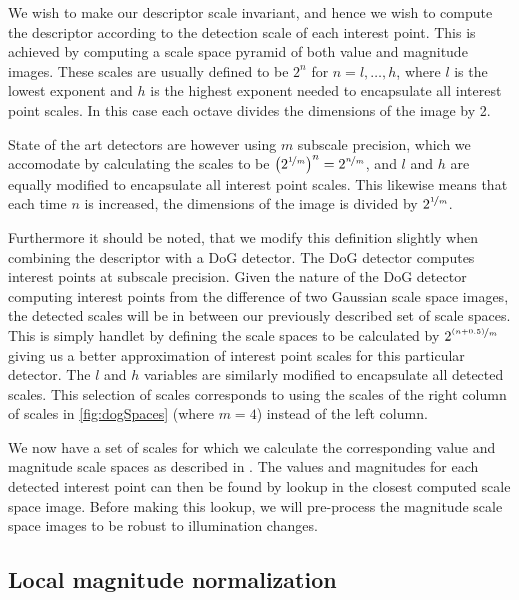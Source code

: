 \documentclass[thesis.tex]{subfiles}
\begin{document}
We wish to make our descriptor scale invariant, and hence we wish to compute the descriptor according to the detection scale of each interest point. This is achieved by computing a scale space pyramid of both value and magnitude images. These scales are usually defined to be $2^n$ for $n = l,\hdots,h$, where $l$ is the lowest exponent and $h$ is the highest exponent needed to encapsulate all interest point scales. In this case each octave divides the dimensions of the image by 2.

State of the art detectors are however using $m$ subscale precision, which we accomodate by calculating the scales to be $\left(2^{\nicefrac{1}{m}}\right)^n = 2^{\nicefrac{n}{m}}$, and $l$ and $h$ are equally modified to encapsulate all interest point scales. This likewise means that each time $n$ is increased, the dimensions of the image is divided by $2^{\nicefrac{1}{m}}$.

Furthermore it should be noted, that we modify this definition slightly when combining the descriptor with a DoG detector. The DoG detector computes interest points at subscale precision. Given the nature of the DoG detector computing interest points from the difference of two Gaussian scale space images, the detected scales will be in between our previously described set of scale spaces. This is simply handlet by defining the scale spaces to be calculated by $2^{\nicefrac{(n+0.5)}{m}}$ giving us a better approximation of interest point scales for this particular detector. The $l$ and $h$ variables are similarly modified to encapsulate all detected scales. This selection of scales corresponds to using the scales of the right column of scales in \cref{fig:dogSpaces} (where $m = 4$) instead of the left column.

We now have a set of scales for which we calculate the corresponding value and magnitude scale spaces as described in . The values and magnitudes for each detected interest point can then be found by lookup in the closest computed scale space image. Before making this lookup, we will pre-process the magnitude scale space images to be robust to illumination changes.

\subsection{Local magnitude normalization}
\end{document}
